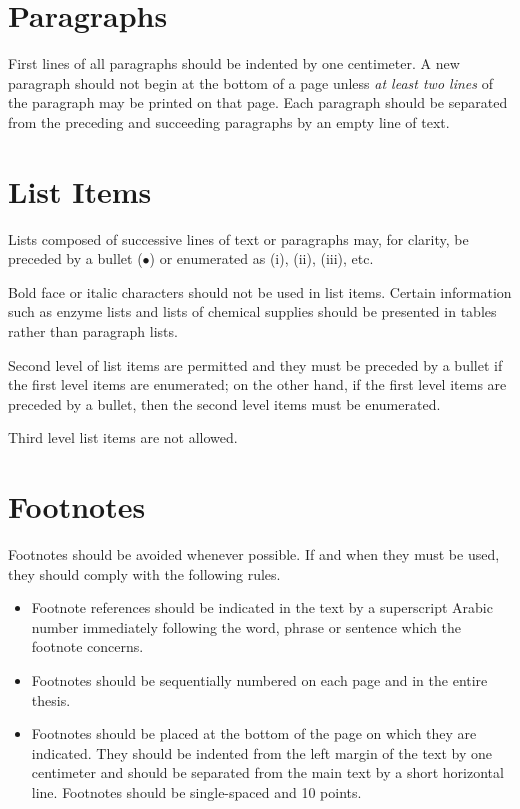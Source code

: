 \documentclass[a4paper,oneside,12pt]{report}
\numberwithin{equation}{chapter}
\begin{document}
\section{Paragraphs}

First lines of all paragraphs should be indented by one centimeter. A new paragraph should not begin at the bottom of a page unless \textit{at least two lines} of the paragraph may be printed on that page. Each paragraph should be separated from the preceding and succeeding paragraphs by an empty line of text.


\section{List Items}
Lists composed of successive lines of text or paragraphs may, for clarity, be preceded by a bullet ($\bullet$) or enumerated as (i), (ii), (iii), etc.

Bold face or italic characters should not be used in list items. Certain information such as enzyme lists and lists of chemical supplies should be presented in tables rather than paragraph lists.

Second level of list items are permitted and they must be preceded by a bullet if the first level items are enumerated; on the other hand, if the first level items are preceded by a bullet, then the second level items must be enumerated.

Third level list items are not allowed.


\section{Footnotes}

Footnotes should be avoided whenever possible. If and when they must be used, they should comply with the following rules.
\begin{itemize}
\item Footnote references should be indicated in the text by a superscript Arabic number immediately following the word, phrase or sentence which the footnote concerns.
\item Footnotes should be sequentially numbered on each page and in the entire thesis.
\item Footnotes should be placed at the bottom of the page on which they are indicated. They should be indented from the left margin of the text by one centimeter and should be separated from the main text by a short horizontal line. Footnotes should be single-spaced and 10 points.
\end{itemize}
\end{document}
